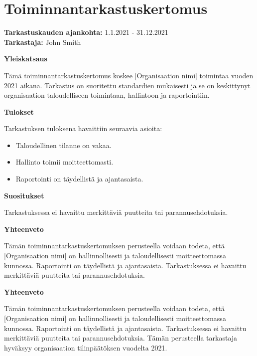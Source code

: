 \documentclass{article}
\begin{document}
\section*{Toiminnantarkastuskertomus}

\textbf{Tarkastuskauden ajankohta:} 1.1.2021 - 31.12.2021 \\
\textbf{Tarkastaja:} John Smith \\

\bigskip

\textbf{Yleiskatsaus}

Tämä toiminnantarkastuskertomus koskee [Organisaation nimi] toimintaa vuoden 2021 aikana. Tarkastus on suoritettu standardien mukaisesti ja se on keskittynyt organisaation taloudelliseen toimintaan, hallintoon ja raportointiin.

\bigskip

\textbf{Tulokset}

Tarkastuksen tuloksena havaittiin seuraavia asioita:

\begin{itemize}
    \item Taloudellinen tilanne on vakaa.
    \item Hallinto toimii moitteettomasti.
    \item Raportointi on täydellistä ja ajantasaista.
\end{itemize}

\bigskip

\textbf{Suositukset}

Tarkastuksessa ei havaittu merkittäviä puutteita tai parannusehdotuksia.

\bigskip

\textbf{Yhteenveto}

Tämän toiminnantarkastuskertomuksen perusteella voidaan todeta, että [Organisaation nimi] on hallinnollisesti ja taloudellisesti moitteettomassa kunnossa. Raportointi on täydellistä ja ajantasaista. Tarkastuksessa ei havaittu merkittäviä puutteita tai parannusehdotuksia.

\textbf{Yhteenveto}

Tämän toiminnantarkastuskertomuksen perusteella voidaan todeta, että [Organisaation nimi] on hallinnollisesti ja taloudellisesti moitteettomassa kunnossa. Raportointi on täydellistä ja ajantasaista. Tarkastuksessa ei havaittu merkittäviä puutteita tai parannusehdotuksia.
Tämän perusteella tarkastaja hyväksyy organisaation tilinpäätöksen vuodelta 2021.

\bigskip
\end{document}
